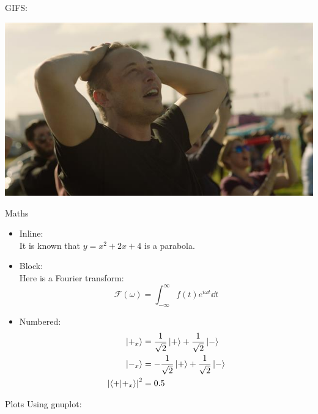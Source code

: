 \documentclass[10pt,aspectratio=169]{beamer}
\begin{document}
\begin{frame}
GIFS:
    \begin{figure}
\end{figure}
\end{frame}
\begin{frame}
\centering
    \includegraphics[width=\textwidth]{oohyeah}
\end{frame}
\begin{frame}{Maths}
\begin{itemize}
    \item Inline:\\
    It is known that $y=x^2+2x+4$ is a parabola.\par
    \item Block:\\
    Here is a Fourier transform:
    \[\mathcal{F}\left(\omega\right)=\int_{-\infty}^\infty f(t) e^{i\omega t}\dd t\]
    \item Numbered:
    \begin{subequations}
    \begin{align}
        \ket{+_x} &= \frac{1}{\sqrt{2}} \ket{+} + \frac{1}{\sqrt{2}} \ket{-}\\
        \ket{-_x} &= -\frac{1}{\sqrt{2}} \ket{+} + \frac{1}{\sqrt{2}} \ket{-}\\
        \abs{\braket{+}{+_x}}^2 &= 0.5
    \end{align}
    \end{subequations}
\end{itemize}

\end{frame}
\begin{frame}{Plots}
Using gnuplot:
\begin{figure}
\centering
{}
\end{figure}
\end{frame}
\end{document}
